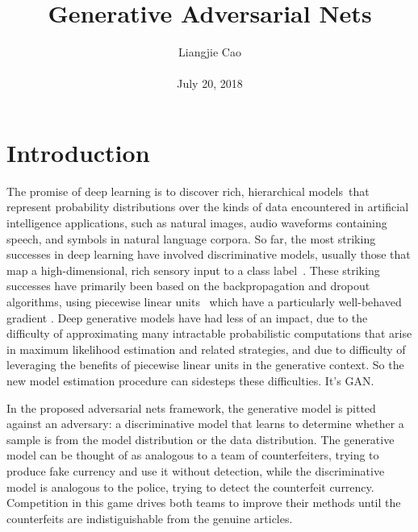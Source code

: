 \documentclass[10pt,twocolumn,letterpaper]{article}
\begin{document}
\title{\textbf{Generative Adversarial Nets}}
\author{Liangjie Cao\\\\ July 20, 2018}
\maketitle
{}
\section{Introduction}
The promise of deep learning is to discover rich, hierarchical models~\cite{name2}that represent probability distributions over the kinds of data encountered in artificial intelligence applications, such as natural
images, audio waveforms containing speech, and symbols in natural language corpora. So far, the most striking successes in deep learning have involved discriminative models, usually those that map a high-dimensional, rich sensory input to a class label~\cite{name14,name22}. These striking successes have primarily been based on the backpropagation and dropout algorithms, using piecewise linear units~\cite{name19,name9,name10} which have a particularly well-behaved gradient . Deep generative models have had less of an impact, due to the difficulty of approximating many intractable probabilistic computations that arise in maximum likelihood estimation and related strategies, and due to difficulty of leveraging the benefits of piecewise linear units in the generative context. So the new model estimation procedure can sidesteps these difficulties. It's GAN.
\par In the proposed adversarial nets framework, the generative model is pitted against an adversary: a discriminative model that learns to determine whether a sample is from the model distribution or the
data distribution. The generative model can be thought of as analogous to a team of counterfeiters, trying to produce fake currency and use it without detection, while the discriminative model is analogous to the police, trying to detect the counterfeit currency. Competition in this game drives
both teams to improve their methods until the counterfeits are indistiguishable from the genuine articles.
\end{document}
